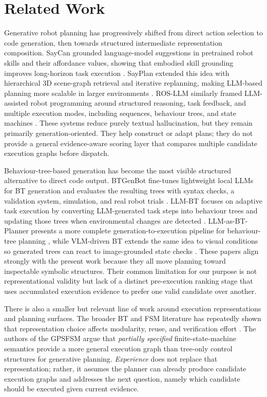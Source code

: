 \documentclass[letterpaper, 10pt, conference]{ieeeconf}
\begin{document}
\section{Related Work}

Generative robot planning has progressively shifted from direct action selection to code generation, then towards structured intermediate representation composition. SayCan grounded language-model suggestions in pretrained robot skills and their affordance values, showing that embodied skill grounding improves long-horizon task execution \cite{ahn_as_2022}. SayPlan extended this idea with hierarchical 3D scene-graph retrieval and iterative replanning, making LLM-based planning more scalable in larger environments \cite{rana_sayplan_2023}. ROS-LLM similarly framed LLM-assisted robot programming around structured reasoning, task feedback, and multiple execution modes, including sequences, behaviour trees, and state machines \cite{mower_ros-llm_2024}. These systems reduce purely textual hallucination, but they remain primarily generation-oriented. They help construct or adapt plans; they do not provide a general evidence-aware scoring layer that compares multiple candidate execution graphs before dispatch.

Behaviour-tree-based generation has become the most visible structured alternative to direct code output. BTGenBot fine-tunes lightweight local LLMs for BT generation and evaluates the resulting trees with syntax checks, a validation system, simulation, and real robot trials \cite{izzo_btgenbot_2024}. LLM-BT focuses on adaptive task execution by converting LLM-generated task steps into behaviour trees and updating those trees when environmental changes are detected \cite{zhou_llm-bt_2024}. LLM-as-BT-Planner presents a more complete generation-to-execution pipeline for behaviour-tree planning \cite{ao_llm-as-bt-planner_2025}, while VLM-driven BT extends the same idea to visual conditions so generated trees can react to image-grounded state checks \cite{wake_vlm-driven_2025}. These papers align strongly with the present work because they all move planning toward inspectable symbolic structures. Their common limitation for our purpose is not representational validity but lack of a distinct pre-execution ranking stage that uses accumulated execution evidence to prefer one valid candidate over another.

There is also a smaller but relevant line of work around execution representations and planning surfaces. The broader BT and FSM literature has repeatedly shown that representation choice affects modularity, reuse, and verification effort \cite{ghzouli_behavior_2023, iovino_programming_2022, iovino_comparison_2024}. The authors of the GPSFSM \cite{ratnayake2026generativepartiallyspecifiedfinite} argue that \textit{partially specified} finite-state-machine semantics provide a more general execution graph than tree-only control structures for generative planning. \textit{Experience} does not replace that representation; rather, it assumes the planner can already produce candidate execution graphs and addresses the next question, namely which candidate should be executed given current evidence.
\end{document}
